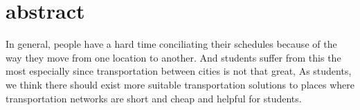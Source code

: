 \chapter*{abstract}
In general, people have a hard time conciliating their schedules because of the way they move from one location to another.  And students suffer from this the most  especially  since transportation between cities is not that great,  As students, we think there should exist more suitable transportation solutions to places where transportation networks are short and cheap and helpful for students.